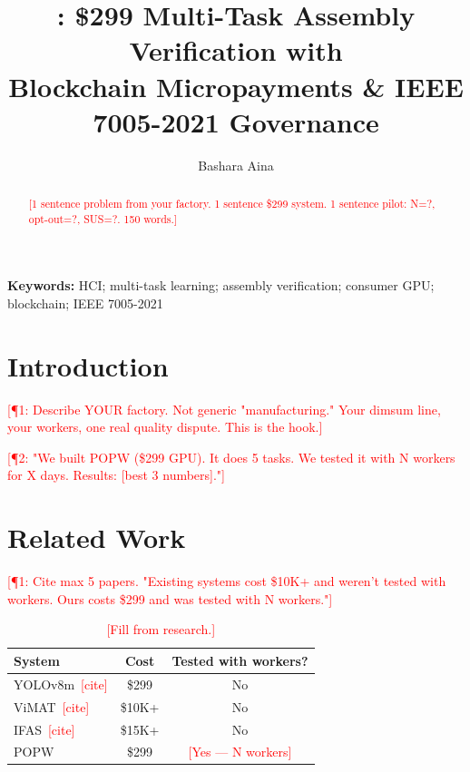 \documentclass[10pt,twocolumn]{article}
\title{\popw: \$299 Multi-Task Assembly Verification with \\ Blockchain Micropayments \& IEEE 7005-2021 Governance}
\author{Bashara Aina}
\date{}
\newcommand{\popw}{POPW}
\newcommand{\need}[1]{\textcolor{red}{[#1]}}
\begin{document}
\maketitle

\begin{abstract}
\need{1 sentence problem from your factory. 1 sentence \$299 system. 1 sentence pilot: N=?, opt-out=?, SUS=?. 150 words.}
\end{abstract}
\textbf{Keywords:} HCI; multi-task learning; assembly verification; consumer GPU; blockchain; IEEE 7005-2021

\section{Introduction}

\need{¶1: Describe YOUR factory. Not generic "manufacturing." Your dimsum line, your workers, one real quality dispute. This is the hook.}

\need{¶2: "We built \popw{} (\$299 GPU). It does 5 tasks. We tested it with N workers for X days. Results: [best 3 numbers]."}

\section{Related Work}

\need{¶1: Cite max 5 papers. "Existing systems cost \$10K+ and weren't tested with workers. Ours costs \$299 and was tested with N workers."}

\begin{table}[htbp]\centering\small\caption{\need{Fill from research.}}
\begin{tabular}{lcc}\toprule
\textbf{System} & \textbf{Cost} & \textbf{Tested with workers?}\\\midrule
YOLOv8m~\need{cite} & \$299 & No\\
ViMAT~\need{cite} & \$10K+ & No\\
IFAS~\need{cite} & \$15K+ & No\\
\popw{} & \$299 & \need{Yes — N workers}\\\bottomrule
\end{tabular}\end{table}
\end{document}

